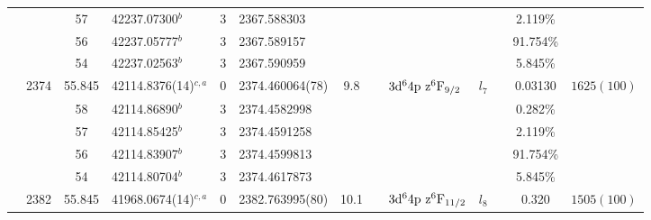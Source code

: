 \begin{table*}
\begin{center}
{\begin{tabular}{:l;l;c;l;c;l;c;l;l;c;c;c;c}
\rowstyle{\itshape}               &        & 57        & 42237.07300$^{b}$                & 3 &   2367.588303      &      & $                                        $ & $                                        $ & $      $ &              & 2.119\%   & $          $\\
\rowstyle{\itshape}               &        & 56        & 42237.05777$^{b}$                & 3 &   2367.589157      &      & $                                        $ & $                                        $ & $      $ &              & 91.754\%  & $          $\\
\rowstyle{\itshape}               &        & 54        & 42237.02563$^{b}$                & 3 &   2367.590959      &      & $                                        $ & $                                        $ & $      $ &              & 5.845\%   & $          $\\
                                  & 2374   & 55.845    & 42114.8376(14)$^{c,a}$           & 0 &   2374.460064(78)  &  9.8 & $                                        $ & $3\rm{d}^64\rm{p~z}^6\rm{F}_{9/2}        $ & $l_{7} $ &              & 0.03130   & $ 1625(100)$\\
\rowstyle{\itshape}               &        & 58        & 42114.86890$^{b}$                & 3 &  2374.4582998      &      & $                                        $ & $                                        $ & $      $ &              & 0.282\%   & $          $\\
\rowstyle{\itshape}               &        & 57        & 42114.85425$^{b}$                & 3 &  2374.4591258      &      & $                                        $ & $                                        $ & $      $ &              & 2.119\%   & $          $\\
\rowstyle{\itshape}               &        & 56        & 42114.83907$^{b}$                & 3 &  2374.4599813      &      & $                                        $ & $                                        $ & $      $ &              & 91.754\%  & $          $\\
\rowstyle{\itshape}               &        & 54        & 42114.80704$^{b}$                & 3 &  2374.4617873      &      & $                                        $ & $                                        $ & $      $ &              & 5.845\%   & $          $\\
                                  & 2382   & 55.845    & 41968.0674(14)$^{c,a}$           & 0 &   2382.763995(80)  & 10.1 & $                                        $ & $3\rm{d}^64\rm{p~z}^6\rm{F}_{11/2}       $ & $l_{8} $ &              & 0.320     & $ 1505(100)$\\

\end{tabular}}
\end{center}
\end{table*}

